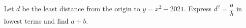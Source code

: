 Let $d$ be the least distance from the origin to $y=x^2-2021$. Express $d^2=\dfrac{a}{b}$ in lowest terms and find $a+b$.
